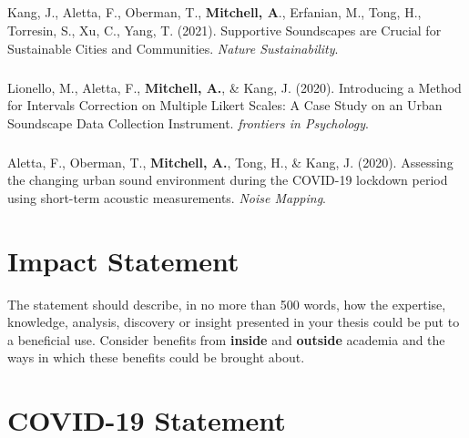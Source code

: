 \documentclass[oneside,fontsize=13pt,titlepage]{scrbook}
\begin{document}
\paragraph*{}
Kang, J., Aletta, F., Oberman, T., \textbf{Mitchell, A}., Erfanian, M., Tong, H., Torresin, S., Xu, C., Yang, T. (2021). Supportive Soundscapes are Crucial for Sustainable Cities and Communities. \emph{Nature Sustainability}.

\paragraph*{}Lionello, M., Aletta, F., \textbf{Mitchell, A.}, \& Kang, J. (2020). Introducing a Method for Intervals Correction on Multiple Likert Scales: A Case Study on an Urban Soundscape Data Collection Instrument. \emph{frontiers in Psychology}.

\paragraph*{}Aletta, F., Oberman, T., \textbf{Mitchell, A.}, Tong, H., \& Kang, J. (2020). Assessing the changing urban sound environment during the COVID-19 lockdown period using short-term acoustic measurements. \emph{Noise Mapping}.




\chapter*{Impact Statement}
The statement should describe, in no more than 500 words, how the expertise, knowledge, analysis, discovery or insight presented in your thesis could be put to a beneficial use. Consider benefits from \textbf{inside} and \textbf{outside} academia and the ways in which these benefits could be brought about.

\chapter*{COVID-19 Statement}
\end{document}
